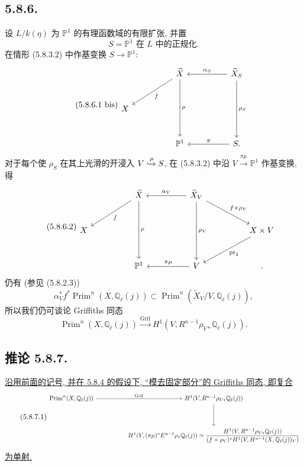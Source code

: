 \subsection*{5.8.6.}
设 $L/k(\eta)$ 为 $\mathbb P^1$ 的有理函数域的有限扩张, 并置
\begin{equation}\tag{5.8.6.1}
S=\text{$\mathbb P^1$ 在 $L$ 中的正规化}.
\end{equation}
在情形 (5.8.3.2) 中作基变换 $S\to\mathbb P^1$:
\begin{equation}\tag{5.8.6.1 bis}
\begin{tikzcd}[column sep=huge,row sep=large]
{} & \widetilde X \arrow[dl,"f"] \arrow[dd,"\rho"]
& \widetilde X_S \arrow[l,"\alpha_S"'] \arrow[dd,"\rho_S"] \\
X&{}&{} \\
{} & \mathbb P^1 & S\arrow[l,"\pi"'] .
\end{tikzcd}
\end{equation}
对于每个使 $\rho_S$ 在其上光滑的开浸入 $V\xhookrightarrow{\mu}S$, 在 (5.8.3.2) 中沿 $V\xrightarrow{\pi\mu}\mathbb P^1$ 作基变换, 得
\begin{equation}\tag{5.8.6.2}
\begin{tikzcd}[column sep=huge,row sep=large]
{} & \widetilde X \arrow[dl,"f"] \arrow[dd,"\rho"]
& \widetilde X_V \arrow[l,"\alpha_V"'] \arrow[dd,"\rho_V"]
  \arrow[dr,"f\times\rho_V"] &{} \\
X&{}&{}&X\times V\arrow[dl,"\operatorname{pr}_2"] \\
{} & \mathbb P^1 & V\arrow[l,"\pi\mu"'] &{} .
\end{tikzcd}
\end{equation}
仍有 (参见 (5.8.2.3))
\begin{equation}\tag{5.8.6.3}
\alpha_V^*f^*\operatorname{Prim}^n(X,\mathbb Q_\ell(j))
\subset
\operatorname{Prim}^n(\widetilde X_V/V,\mathbb Q_\ell(j)),
\end{equation}
所以我们仍可谈论 Griffiths 同态
\begin{equation}\tag{5.8.6.4}
\operatorname{Prim}^n(X,\mathbb Q_\ell(j))
\xrightarrow{\operatorname{Grif}}
H^1(V,R^{n-1}\rho_{V*}\mathbb Q_\ell(j)).
\end{equation}

\subsection*{推论 5.8.7.}
\underline{沿用前面的记号, 并在 5.8.4 的假设下, “模去固定部分”的 Griffiths 同态, 即复合}
\begin{equation}\tag{5.8.7.1}
\resizebox{\textwidth}{!}{%
\begin{tikzcd}[ampersand replacement=\&,column sep=huge,row sep=huge]
\operatorname{Prim}^n(X,\mathbb Q_\ell(j))
  \arrow[r,"\operatorname{Grif}"]
\& H^1(V,R^{n-1}\rho_{V*}\mathbb Q_\ell(j)) \arrow[d] \\
{}
\& H^1(V,(\pi\mu)^*E^{n-1}\rho_*\mathbb Q_\ell(j))
\simeq
\dfrac{H^1(V,R^{n-1}\rho_{V*}\mathbb Q_\ell(j))}
{(f\times\rho_V)^*H^1(V,H^{n-1}(X,\mathbb Q_\ell(j))_V)}
\end{tikzcd}}
\end{equation}
\underline{为单射.}

